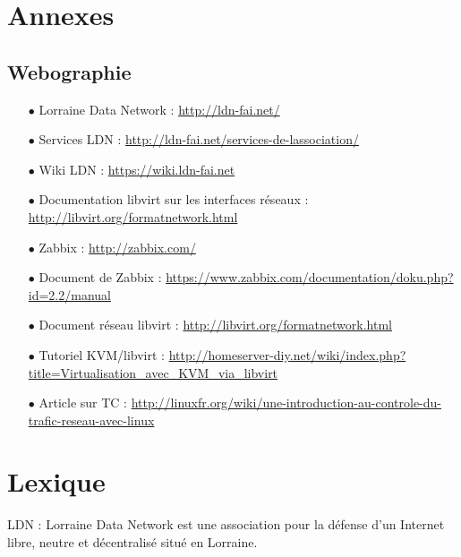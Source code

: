 \section{Annexes}
	\subsection{Webographie}
		\vspace{0.3cm}
		\begin{itemize}
			\item[$\bullet$] Lorraine Data Network : \url{http://ldn-fai.net/}

			\item[$\bullet$] Services LDN : \url{http://ldn-fai.net/services-de-lassociation/}

			\item[$\bullet$] Wiki LDN : \url{https://wiki.ldn-fai.net}

			\item[$\bullet$] Documentation libvirt sur les interfaces réseaux : \url{http://libvirt.org/formatnetwork.html}

			\item[$\bullet$] Zabbix : \url{http://zabbix.com/}

			\item[$\bullet$] Document de Zabbix : \url{https://www.zabbix.com/documentation/doku.php?id=2.2/manual}

			\item[$\bullet$] Document réseau libvirt : \url{http://libvirt.org/formatnetwork.html}

			\item[$\bullet$] Tutoriel KVM/libvirt : \url{http://homeserver-diy.net/wiki/index.php?title=Virtualisation_avec_KVM_via_libvirt}

			\item[$\bullet$] Article sur TC : \url{http://linuxfr.org/wiki/une-introduction-au-controle-du-trafic-reseau-avec-linux}
		\end{itemize}

\newpage

\section{Lexique}
	\vspace{0.3cm}

	LDN : Lorraine Data Network est une association pour la défense d'un Internet libre, neutre et décentralisé situé en Lorraine.\\

